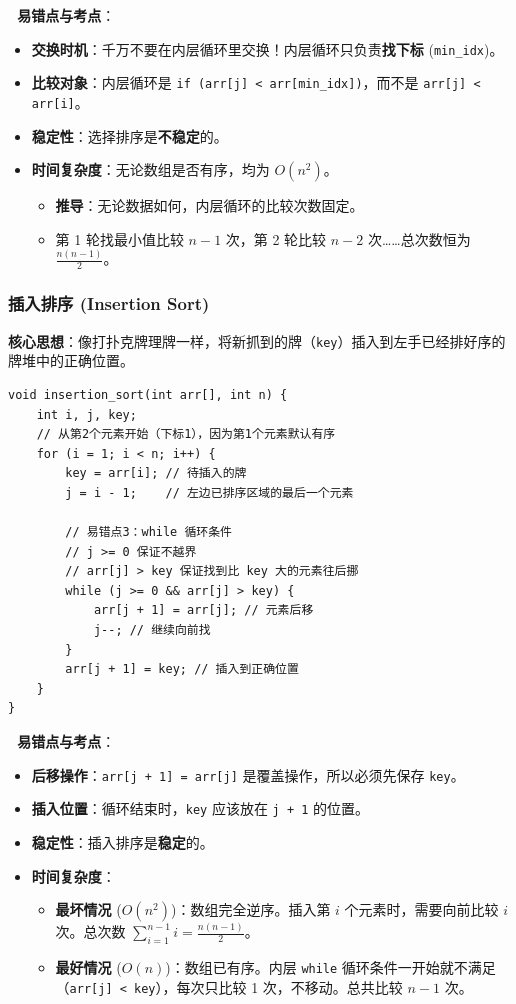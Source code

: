 \documentclass[a4paper,12pt]{article}
\begin{document}
\textbf{🔴 易错点与考点}：
\begin{itemize}
    \item \textbf{交换时机}：千万不要在内层循环里交换！内层循环只负责\textbf{找下标} (\texttt{min\_idx})。
    \item \textbf{比较对象}：内层循环是 \texttt{if (arr[j] < arr[min\_idx])}，而不是 \texttt{arr[j] < arr[i]}。
    \item \textbf{稳定性}：选择排序是\textbf{不稳定}的。
    \item \textbf{时间复杂度}：无论数组是否有序，均为 $O(n^2)$。
    \begin{itemize}
        \item \textbf{推导}：无论数据如何，内层循环的比较次数固定。
        \item 第 1 轮找最小值比较 $n-1$ 次，第 2 轮比较 $n-2$ 次……总次数恒为 $\frac{n(n-1)}{2}$。
    \end{itemize}
\end{itemize}

\subsubsection{插入排序 (Insertion Sort)}
\textbf{核心思想}：像打扑克牌理牌一样，将新抓到的牌（\texttt{key}）插入到左手已经排好序的牌堆中的正确位置。

\begin{lstlisting}
void insertion_sort(int arr[], int n) {
    int i, j, key;
    // 从第2个元素开始（下标1），因为第1个元素默认有序
    for (i = 1; i < n; i++) {
        key = arr[i]; // 待插入的牌
        j = i - 1;    // 左边已排序区域的最后一个元素
        
        // 易错点3：while 循环条件
        // j >= 0 保证不越界
        // arr[j] > key 保证找到比 key 大的元素往后挪
        while (j >= 0 && arr[j] > key) {
            arr[j + 1] = arr[j]; // 元素后移
            j--; // 继续向前找
        }
        arr[j + 1] = key; // 插入到正确位置
    }
}
\end{lstlisting}

\textbf{🔴 易错点与考点}：
\begin{itemize}
    \item \textbf{后移操作}：\texttt{arr[j + 1] = arr[j]} 是覆盖操作，所以必须先保存 \texttt{key}。
    \item \textbf{插入位置}：循环结束时，\texttt{key} 应该放在 \texttt{j + 1} 的位置。
    \item \textbf{稳定性}：插入排序是\textbf{稳定}的。
    \item \textbf{时间复杂度}：
    \begin{itemize}
        \item \textbf{最坏情况} ($O(n^2)$)：数组完全逆序。插入第 $i$ 个元素时，需要向前比较 $i$ 次。总次数 $\sum_{i=1}^{n-1} i = \frac{n(n-1)}{2}$。
        \item \textbf{最好情况} ($O(n)$)：数组已有序。内层 \texttt{while} 循环条件一开始就不满足（\texttt{arr[j] < key}），每次只比较 1 次，不移动。总共比较 $n-1$ 次。
    \end{itemize}
\end{itemize}
\end{document}
